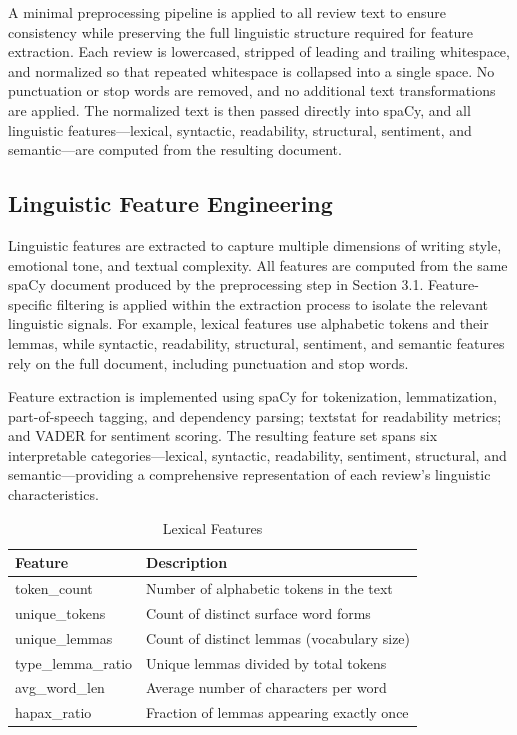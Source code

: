 \documentclass[12pt]{article}
\begin{document}
A minimal preprocessing pipeline is applied to all review text to ensure consistency while preserving the full linguistic structure required for feature extraction. Each review is lowercased, stripped of leading and trailing whitespace, and normalized so that repeated whitespace is collapsed into a single space. No punctuation or stop words are removed, and no additional text transformations are applied. The normalized text is then passed directly into spaCy, and all linguistic features—lexical, syntactic, readability, structural, sentiment, and semantic—are computed from the resulting document.

\subsection{Linguistic Feature Engineering}

Linguistic features are extracted to capture multiple dimensions of writing style, emotional tone, and textual complexity. All features are computed from the same spaCy document produced by the preprocessing step in Section 3.1. Feature-specific filtering is applied within the extraction process to isolate the relevant linguistic signals. For example, lexical features use alphabetic tokens and their lemmas, while syntactic, readability, structural, sentiment, and semantic features rely on the full document, including punctuation and stop words.

Feature extraction is implemented using spaCy for tokenization, lemmatization, part-of-speech tagging, and dependency parsing; textstat for readability metrics; and VADER for sentiment scoring. The resulting feature set spans six interpretable categories—lexical, syntactic, readability, sentiment, structural, and semantic—providing a comprehensive representation of each review's linguistic characteristics.

\begin{longtable}{ll}
\caption{Lexical Features} \\
\textbf{Feature} & \textbf{Description} \\
\hline
token\_count & Number of alphabetic tokens in the text \\
unique\_tokens & Count of distinct surface word forms \\
unique\_lemmas & Count of distinct lemmas (vocabulary size) \\
type\_lemma\_ratio & Unique lemmas divided by total tokens \\
avg\_word\_len & Average number of characters per word \\
hapax\_ratio & Fraction of lemmas appearing exactly once \\
\end{longtable}
\end{document}
